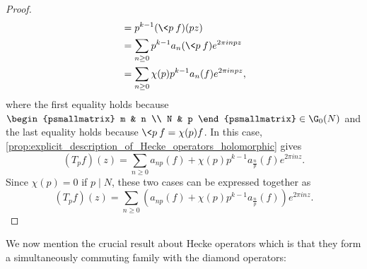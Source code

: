 \begin{proof}
\begin{align*}
        &= p^{k-1}(\<p\>f)(pz) \\
        &= \sum_{n \ge 0}p^{k-1}a_{n}(\<p\>f)e^{2\pi inpz} \\
        &= \sum_{n \ge 0}\chi(p)p^{k-1}a_{n}(f)e^{2\pi inpz},
      \end{align*}
      where the first equality holds because $\begin{psmallmatrix} m & n \\ N & p \end{psmallmatrix} \in \G_{0}(N)$ and the last equality holds because $\<p\>f = \chi(p)f$. In this case, \cref{prop:explicit_description_of_Hecke_operators_holomorphic} gives
      \[
        (T_{p}f)(z) = \sum_{n \ge 0}a_{np}(f)+\chi(p)p^{k-1}a_{\frac{n}{p}}(f)e^{2\pi inz}.
      \]
      Since $\chi(p) = 0$ if $p \mid N$, these two cases can be expressed together as 
      \[
        (T_{p}f)(z) = \sum_{n \ge 0}\left(a_{np}(f)+\chi(p)p^{k-1}a_{\frac{n}{p}}(f)\right)e^{2\pi inz}.
      \]
    \end{proof}

    We now mention the crucial result about Hecke operators which is that they form a simultaneously commuting family with the diamond operators:

